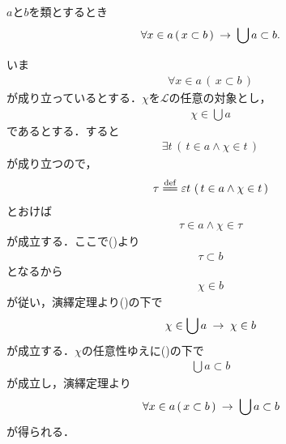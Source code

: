 	\begin{screen}
		\begin{thm}[部分集合の合併は部分類]\label{thm:union_of_subsets_is_subclass}
			$a$と$b$を類とするとき
			\begin{align}
				\forall x \in a\, (\, x \subset b\, ) \hspace{0.25em}\rightarrow\hspace{0.25em} \bigcup a \subset b.
			\end{align}
		\end{thm}
	\end{screen}
	
	\begin{sketch}
		いま
		\begin{align}
			\forall x \in a\, (\, x \subset b\, )
			\label{fom:thm_union_of_subsets_is_subclass_1}
		\end{align}
		が成り立っているとする．$\chi$を$\mathcal{L}$の任意の対象とし，
		\begin{align}
			\chi \in \bigcup a
		\end{align}
		であるとする．すると
		\begin{align}
			\exists t\, \left(\, t \in a \wedge \chi \in t\, \right)
		\end{align}
		が成り立つので，
		\begin{align}
			\tau \defeq \varepsilon t\, \left(\, t \in a \wedge \chi \in t\, \right)
		\end{align}
		とおけば
		\begin{align}
			\tau \in a \wedge \chi \in \tau
		\end{align}
		が成立する．ここで()より
		\begin{align}
			\tau \subset b
		\end{align}
		となるから
		\begin{align}
			\chi \in b
		\end{align}
		が従い，演繹定理より()の下で
		\begin{align}
			\chi \in \bigcup a \hspace{0.25em}\rightarrow\hspace{0.25em} \chi \in b
		\end{align}
		が成立する．$\chi$の任意性ゆえに()の下で
		\begin{align}
			\bigcup a \subset b
		\end{align}
		が成立し，演繹定理より
		\begin{align}
			\forall x \in a\, (\, x \subset b\, ) \hspace{0.25em}\rightarrow\hspace{0.25em} \bigcup a \subset b
		\end{align}
		が得られる．
		\QED
	\end{sketch}